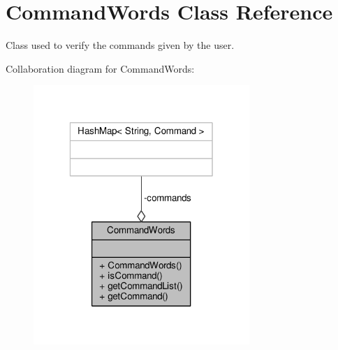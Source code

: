 \hypertarget{classCommandWords}{\section{Command\-Words Class Reference}
\label{classCommandWords}
}


Class used to verify the commands given by the user.  




Collaboration diagram for Command\-Words\-:
\nopagebreak
\begin{figure}[H]
\begin{center}
\leavevmode
\includegraphics[width=232pt]{classCommandWords__coll__graph}
\end{center}
\end{figure}
